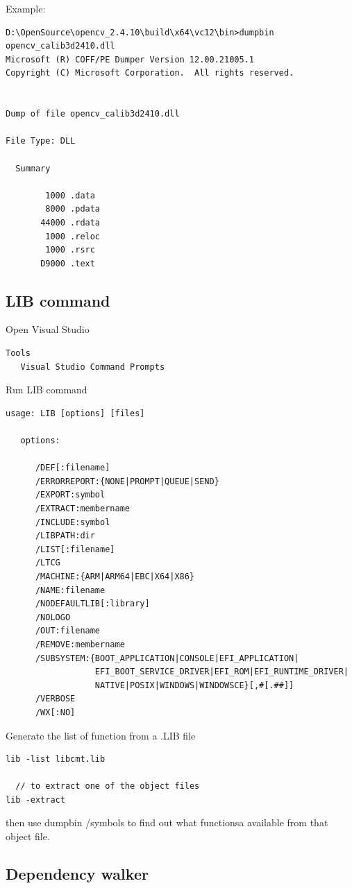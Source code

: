 Example:
\begin{verbatim}
D:\OpenSource\opencv_2.4.10\build\x64\vc12\bin>dumpbin opencv_calib3d2410.dll
Microsoft (R) COFF/PE Dumper Version 12.00.21005.1
Copyright (C) Microsoft Corporation.  All rights reserved.


Dump of file opencv_calib3d2410.dll

File Type: DLL

  Summary

        1000 .data
        8000 .pdata
       44000 .rdata
        1000 .reloc
        1000 .rsrc
       D9000 .text
\end{verbatim}

\subsection{LIB command}
\label{sec:LIB_command}

Open Visual Studio
\begin{verbatim}
Tools
   Visual Studio Command Prompts
\end{verbatim}

Run LIB command
\begin{verbatim}
usage: LIB [options] [files]

   options:

      /DEF[:filename]
      /ERRORREPORT:{NONE|PROMPT|QUEUE|SEND}
      /EXPORT:symbol
      /EXTRACT:membername
      /INCLUDE:symbol
      /LIBPATH:dir
      /LIST[:filename]
      /LTCG
      /MACHINE:{ARM|ARM64|EBC|X64|X86}
      /NAME:filename
      /NODEFAULTLIB[:library]
      /NOLOGO
      /OUT:filename
      /REMOVE:membername
      /SUBSYSTEM:{BOOT_APPLICATION|CONSOLE|EFI_APPLICATION|
                  EFI_BOOT_SERVICE_DRIVER|EFI_ROM|EFI_RUNTIME_DRIVER|
                  NATIVE|POSIX|WINDOWS|WINDOWSCE}[,#[.##]]
      /VERBOSE
      /WX[:NO]

\end{verbatim}

Generate the list of function from a .LIB file
\begin{verbatim}
lib -list libcmt.lib

  // to extract one of the object files
lib -extract
\end{verbatim}
then use dumpbin /symbols to find out what functionsa available from that object file.

\subsection{Dependency walker}


